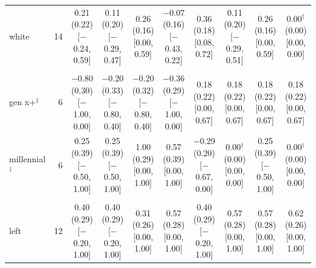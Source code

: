 \begin{table}[t]
\begin{tabular}{@{}lr*{8}{c}@{}}
\quad white & 14 & \makecell{0.21 (0.22)\\ {[}$-$0.24, 0.59{]}} & \makecell{0.11 (0.20)\\ {[}$-$0.29, 0.47{]}} & \makecell{0.26 (0.16)\\ {[}0.00, 0.59{]}} & \makecell{$-$0.07 (0.16)\\ {[}$-$0.43, 0.22{]}} & \makecell{0.36 (0.18)\\ {[}0.08, 0.72{]}} & \makecell{0.11 (0.20)\\ {[}$-$0.29, 0.51{]}} & \makecell{0.26 (0.16)\\ {[}0.00, 0.59{]}} & \makecell{0.00$^\dagger$ (0.00)\\ {[}0.00, 0.00{]}} \\
\addlinespace
\multicolumn{10}{@{}l}{\textit{Age (D)}} \\
\quad gen x+$^{\ddagger}$ & 6 & \makecell{$-$0.80 (0.30)\\ {[}$-$1.00, 0.00{]}} & \makecell{$-$0.20 (0.33)\\ {[}$-$0.80, 0.40{]}} & \makecell{$-$0.20 (0.32)\\ {[}$-$0.80, 0.40{]}} & \makecell{$-$0.36 (0.29)\\ {[}$-$1.00, 0.00{]}} & \makecell{0.18 (0.22)\\ {[}0.00, 0.67{]}} & \makecell{0.18 (0.22)\\ {[}0.00, 0.67{]}} & \makecell{0.18 (0.22)\\ {[}0.00, 0.67{]}} & \makecell{0.18 (0.22)\\ {[}0.00, 0.67{]}} \\
\quad millennial$^{\ddagger}$ & 6 & \makecell{0.25 (0.39)\\ {[}$-$0.50, 1.00{]}} & \makecell{0.25 (0.39)\\ {[}$-$0.50, 1.00{]}} & \makecell{1.00 (0.29)\\ {[}0.00, 1.00{]}} & \makecell{0.57 (0.39)\\ {[}0.00, 1.00{]}} & \makecell{$-$0.29 (0.20)\\ {[}$-$0.67, 0.00{]}} & \makecell{0.00$^\dagger$ (0.00)\\ {[}0.00, 0.00{]}} & \makecell{0.25 (0.39)\\ {[}$-$0.50, 1.00{]}} & \makecell{0.00$^\dagger$ (0.00)\\ {[}0.00, 0.00{]}} \\
\addlinespace
\multicolumn{10}{@{}l}{\textit{Politics (N)}} \\
\quad left & 12 & \makecell{0.40 (0.29)\\ {[}$-$0.20, 1.00{]}} & \makecell{0.40 (0.29)\\ {[}$-$0.20, 1.00{]}} & \makecell{0.31 (0.26)\\ {[}0.00, 1.00{]}} & \makecell{0.57 (0.28)\\ {[}0.00, 1.00{]}} & \makecell{0.40 (0.29)\\ {[}$-$0.20, 1.00{]}} & \makecell{0.57 (0.28)\\ {[}0.00, 1.00{]}} & \makecell{0.57 (0.28)\\ {[}0.00, 1.00{]}} & \makecell{0.62 (0.26)\\ {[}0.00, 1.00{]}} \\

\end{tabular}
\end{table}
